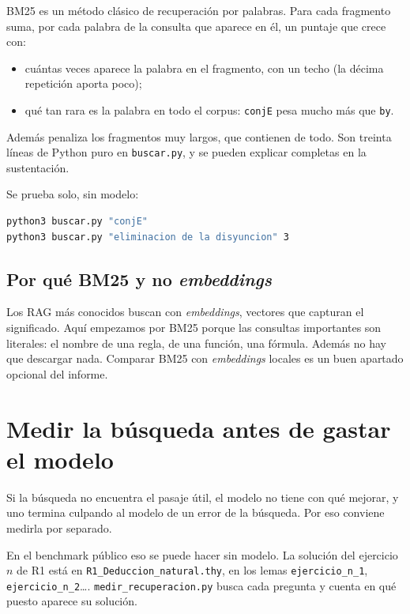 \documentclass[11pt,a4paper]{article}
\newcommand{\cd}[1]{\texttt{\small #1}}
\begin{document}
BM25 es un método clásico de recuperación por palabras. Para cada
fragmento suma, por cada palabra de la consulta que aparece en él, un
puntaje que crece con:

\begin{itemize}
  \item cuántas veces aparece la palabra en el fragmento, con un techo
    (la décima repetición aporta poco);
  \item qué tan rara es la palabra en todo el corpus: \cd{conjE} pesa
    mucho más que \cd{by}.
\end{itemize}

Además penaliza los fragmentos muy largos, que contienen de todo. Son
treinta líneas de Python puro en \cd{buscar.py}, y se pueden explicar
completas en la sustentación.

Se prueba solo, sin modelo:

\begin{haga}
\begin{lstlisting}[language=bash]
python3 buscar.py "conjE"
python3 buscar.py "eliminacion de la disyuncion" 3
\end{lstlisting}
\end{haga}

\subsection{Por qué BM25 y no \emph{embeddings}}

Los RAG más conocidos buscan con \emph{embeddings}, vectores que capturan
el significado. Aquí empezamos por BM25 porque las consultas importantes son
literales: el nombre de una regla, de una función, una fórmula. Además no
hay que descargar nada. Comparar BM25 con \emph{embeddings} locales es un
buen apartado opcional del informe.

\section{Medir la búsqueda antes de gastar el modelo}

Si la búsqueda no encuentra el pasaje útil, el modelo no tiene con qué
mejorar, y uno termina culpando al modelo de un error de la búsqueda. Por
eso conviene medirla por separado.

En el benchmark público eso se puede hacer sin modelo. La solución del
ejercicio $n$ de R1 está en \cd{R1\_Deduccion\_natural.thy}, en los lemas
\cd{ejercicio\_n\_1}, \cd{ejercicio\_n\_2}\ldots. \cd{medir\_recuperacion.py}
busca cada pregunta y cuenta en qué puesto aparece su solución.
\end{document}
